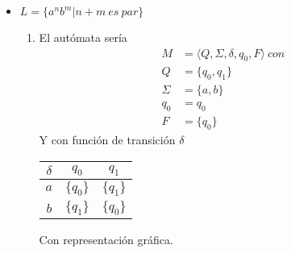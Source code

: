 \documentclass{article}
\begin{document}
\begin{enumerate}
{\begin{itemize}
                    
                

                \item $L = \{a^{n} b^{m} | n + m \ es\ par \}$
                \begin{enumerate}
                	\item {
                		El autómata sería
                		\begin{align*}
                		M &= \langle Q, \Sigma, \delta, q_{0}, F \rangle \ con\\
                		Q &= \{q_{0}, q_{1}\} \\
                		\Sigma &= \{a, b\} \\
                		q_{0} &= q_{0} \\
                		F &= \{q_{0}\}
                		\end{align*}
                		Y con función de transición $\delta$
                		
                		\begin{table}[H]
                			\centering
                			\begin{tabular}{|c|c|c|}
                				\hline
                				$\delta$ & $q_{0}$ & $q_{1}$ \\
                				\hline
                				$a$ & $\{q_{0}\}$ & $\{q_{1}\}$ \\
                				\hline
                				$b$ & $\{q_{1}\}$ & $\{q_{0}\}$ \\
                				\hline
                			\end{tabular}
                		\end{table}
                		
                		Con representación gráfica.
                		\begin{center}
                		\end{center}
                	}
                \end{enumerate}
            \end{itemize}
            
        }
    \end{enumerate}
\end{document}
